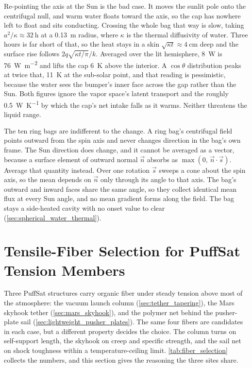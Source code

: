 \documentclass{article}
\begin{document}
Re-pointing the axis at the Sun is the bad case. It moves the sunlit pole onto the centrifugal null, and warm water floats toward the axis, so the cap has nowhere left to float and sits conducting. Crossing the whole bag that way is slow, taking \(a^{2}/\kappa \approx \SI{32}{\hour}\) at a \SI{0.13}{\meter} radius, where \(\kappa\) is the thermal diffusivity of water. Three hours is far short of that, so the heat stays in a skin \(\sqrt{\kappa t} \approx \SI{4}{\centi\meter}\) deep and the surface rise follows \(2q\sqrt{\kappa t/\pi}/k\). Averaged over the lit hemisphere, \SI{8}{\watt} is \SI{76}{\watt\per\square\meter} and lifts the cap \SI{6}{\kelvin} above the interior. A \(\cos\theta\) distribution peaks at twice that, \SI{11}{\kelvin} at the sub-solar point, and that reading is pessimistic, because the water sees the bumper's inner face across the gap rather than the Sun. Both figures ignore the vapor space's latent transport and the roughly \SI{0.5}{\watt\per\kelvin} by which the cap's net intake falls as it warms. Neither threatens the liquid range.

The ten ring bags are indifferent to the change. A ring bag's centrifugal field points outward from the spin axis and never changes direction in the bag's own frame. The Sun direction does change, and it cannot be averaged as a vector, because a surface element of outward normal \(\vec{n}\) absorbs as \(\max(0,\,\vec{n}\cdot\vec{s})\). Average that quantity instead. Over one rotation \(\vec{s}\) sweeps a cone about the spin axis, so the mean depends on \(\vec{n}\) only through its angle to that axis. The bag's outward and inward faces share the same angle, so they collect identical mean flux at every Sun angle, and no mean gradient forms along the field. The bag stays a side-heated cavity with no onset value to clear (\autoref{sec:spherical_water_thermal}).

\section{Tensile-Fiber Selection for PuffSat Tension Members}\label{sec:fiber_selection}
Three PuffSat structures carry organic fiber under steady tension above most of the atmosphere: the vacuum launch column (\autoref{sec:tether_tapering}), the Mars skyhook tether (\autoref{sec:mars_skyhook}), and the polymer net behind the pusher-plate sail (\autoref{sec:lightweight_pusher_plates}). The same four fibers are candidates in each case, but a different property decides the choice. The column turns on self-support length, the skyhook on creep and specific strength, and the sail net on shock toughness within a temperature-ceiling limit. \autoref{tab:fiber_selection} collects the numbers, and this section gives the reasoning the three sites share.
\end{document}
